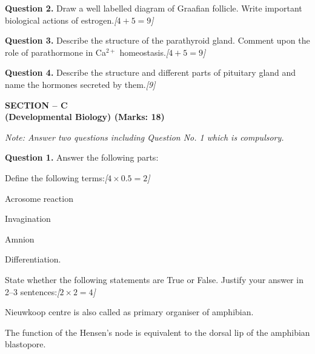 \documentclass[11pt,a4paper]{article}
\newcommand{\pts}[1]{\hfill   \textit{[#1]}}
\begin{document}
\medskip


\noindent   \textbf{Question 2.} Draw a well labelled diagram of Graafian follicle. Write important biological actions of estrogen.\pts{$4 + 5 = 9$}

\medskip


\noindent   \textbf{Question 3.} Describe the structure of the parathyroid gland. Comment upon the role of parathormone in Ca$^{2+}$ homeostasis.\pts{$4 + 5 = 9$}

\medskip


\noindent   \textbf{Question 4.} Describe the structure and different parts of pituitary gland and name the hormones secreted by them.\pts{9}

\pagebreak

\begin{center}
   \textbf{SECTION -- C} \\
   \textbf{(Developmental Biology) (Marks: 18)}
\end{center}

\smallskip



\noindent   \textit{Note: Answer two questions including Question No. 1 which is compulsory.}

\medskip


\noindent   \textbf{Question 1.} Answer the following parts:

\begin{parts}
  \item Define the following terms:\pts{$4  \times 0.5 = 2$}
  
\begin{parts}
    \item Acrosome reaction
    \item Invagination
    \item Amnion
    \item Differentiation.
  \end{parts}

  \item State whether the following statements are True or False. Justify your answer in 2--3 sentences:\pts{$2  \times 2 = 4$}
  
\begin{parts}
    \item Nieuwkoop centre is also called as primary organiser of amphibian.
    \item The function of the Hensen's node is equivalent to the dorsal lip of the amphibian blastopore.
  \end{parts}
\end{parts}
\end{document}
